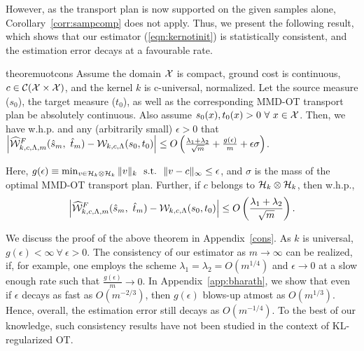 However, as the transport plan is now supported on the given samples alone, Corollary~\ref{corr:sampcomp} does not apply. Thus, we present the following result, which shows that our estimator (\ref{eqn:kernotinit}) is statistically consistent, and the estimation error decays at a favourable rate.
\begin{theoremBox}
\begin{restatable}{theorem}{uotcons}\label{thm:cons} 
Assume the domain $\mathcal{X}$ is compact, ground cost is continuous, $c\in\mathcal{C}(\mathcal{X}\times\mathcal{X})$, and the kernel $k$ is c-universal, normalized. Let the source measure ($s_0$), the target measure ($t_0$), as well as the corresponding MMD-OT transport plan be absolutely continuous. Also assume $s_0(x),t_0(x)>0\ \forall\ x\in\calX$. Then, we have w.h.p. and any (arbitrarily small) $\epsilon>0$ that $\left|\hatcalUF(\hat{s}_m,\ \hat{t}_m)-\calU(s_0,t_0)\right|\le O\left(\frac{\lambda_1+\lambda_2}{\sqrt{m}}+\frac{g(\epsilon)}{m}+\epsilon\sigma\right)$. 

Here, $g(\epsilon)\equiv\min_{v\in\calH_k\otimes\calH_k}\|v\|_k\ \ \textup{s.t.}\ \ \|v-c\|_\infty\le\epsilon$, and $\sigma$ is the mass of the optimal MMD-OT transport plan. Further, if $c$ belongs to $\mathcal{H}_k\otimes\mathcal{H}_k$, then w.h.p., $$\left|\hatcalUF(\hat{s}_m,\ \hat{t}_m)-\calU(s_0,t_0)\right|\le O\left(\frac{\lambda_1+\lambda_2}{\sqrt{m}}\right).$$
\end{restatable}
\end{theoremBox}
We discuss the proof of the above theorem in Appendix~\ref{cons}. As $k$ is universal, $g(\epsilon)<\infty\ \forall\ \epsilon>0$. The consistency of our estimator as $m\rightarrow\infty$ can be realized, if, for example, one employs the scheme $\lambda_1=\lambda_2=O(m^{1/4})$ and $\epsilon\rightarrow0$ at a slow enough rate such that 
$\frac{g(\epsilon)}{m}\rightarrow0$. In Appendix~\ref{app:bharath}, we show that even if $\epsilon$ decays as fast as $O\left(m^{-2/3}\right)$, then $g(\epsilon)$ blows-up atmost as $O\left({m^{1/3}}\right)$. Hence, overall, the estimation error still decays as $O\left(m^{-1/4}\right)$. To the best of our knowledge, such consistency results have not been studied in the context of KL-regularized OT.

